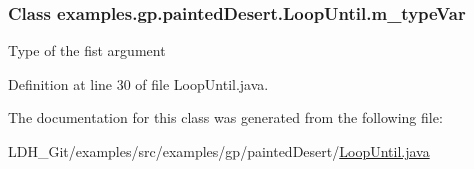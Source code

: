 \hypertarget{classexamples_1_1gp_1_1painted_desert_1_1_loop_until_a75c9e286dacb1b598da2ef2245657865}{
\subsubsection[{m\-\_\-type\-Var}]{\setlength{\rightskip}{0pt plus 5cm}Class examples.\-gp.\-painted\-Desert.\-Loop\-Until.\-m\-\_\-type\-Var\hspace{0.3cm}{\ttfamily [private]}}}\label{classexamples_1_1gp_1_1painted_desert_1_1_loop_until_a75c9e286dacb1b598da2ef2245657865}
Type of the fist argument 

Definition at line 30 of file Loop\-Until.\-java.



The documentation for this class was generated from the following file\-:\begin{DoxyCompactItemize}
\item 
L\-D\-H\-\_\-\-Git/examples/src/examples/gp/painted\-Desert/\hyperlink{_loop_until_8java}{Loop\-Until.\-java}\end{DoxyCompactItemize}
